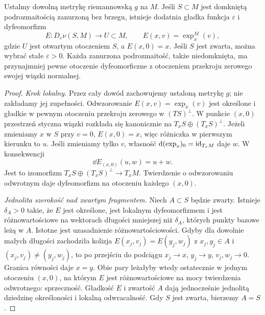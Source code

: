 \begin{twierdzenie}
\label{thm:otoczenie-tubularne}
Ustalmy dowolną metrykę riemannowską $g$ na $M$.
Jeśli $S\subset M$ jest domkniętą podrozmaitością
zanurzoną bez brzegu, istnieje dodatnia gładka
funkcja $\varepsilon$ i dyfeomorfizm
\[
 E:D_\varepsilon\nu(S,M)\longrightarrow U\subset M,
 \qquad E(x,v)=\exp_x^M(v),
\]
gdzie $U$ jest otwartym otoczeniem $S$,
a $E(x,0)=x$. Jeśli $S$ jest zwarta,
można wybrać stałe $\varepsilon>0$.
Każda zanurzona podrozmaitość, także
niedomknięta, ma przynajmniej pewne
otoczenie dyfeomorficzne z otoczeniem
przekroju zerowego swojej wiązki normalnej.
\end{twierdzenie}
\begin{proof}
\emph{Krok lokalny.} Przez cały dowód zachowujemy
ustaloną metrykę $g$; nie zakładamy jej zupełności.
Odwzorowanie
$E(x,v)=\exp_x(v)$ jest określone i gładkie
w pewnym otoczeniu przekroju zerowego
w $(TS)^\perp$. W punkcie $(x,0)$
przestrzeń styczna wiązki rozkłada się
kanonicznie na $T_xS\oplus(T_xS)^\perp$.
Jeżeli zmieniamy $x$ w $S$ przy $v=0$,
$E(x,0)=x$, więc różniczka w pierwszym
kierunku to $u$. Jeśli zmieniamy tylko
$v$, własność
$\mathrm d(\exp_x)_0=\mathrm{id}_{T_xM}$ daje $w$.
W konsekwencji
\begin{equation}\label{eq:tuba-rozniczka}
 \dd E_{(x,0)}(u,w)=u+w.
\end{equation}
Jest to izomorfizm
$T_xS\oplus(T_xS)^\perp\to T_xM$.
Twierdzenie o odwzorowaniu odwrotnym
daje dyfeomorfizm na otoczeniu
każdego $(x,0)$.

\emph{Jednolita szerokość nad zwartym
fragmentem.} Niech $A\subset S$ będzie
zwarty. Istnieje $\delta_A>0$ takie, że
$E$ jest określone, jest lokalnym
dyfeomorfizmem i jest różnowartościowe
na wektorach długości mniejszej niż
$\delta_A$, których punkty bazowe
leżą w $A$. Istotne jest uzasadnienie
różnowartościowości. Gdyby dla dowolnie
małych długości zachodziła kolizja
$E(x_j,v_j)=E(y_j,w_j)$ z $x_j,y_j\in A$
i $(x_j,v_j)\ne(y_j,w_j)$, to po
przejściu do podciągu
$x_j\to x$, $y_j\to y$, $v_j,w_j\to0$.
Granica równości daje $x=y$.
Obie pary leżałyby wtedy ostatecznie
w jednym otoczeniu $(x,0)$, na którym
$E$ jest różnowartościowe na mocy
twierdzenia odwrotnego: sprzeczność.
Gładkość $E$ i zwartość $A$ dają
jednocześnie jednolitą dziedzinę
określoności i lokalną odwracalność.
Gdy $S$ jest zwarta, bierzemy $A=S$.


\end{proof}
